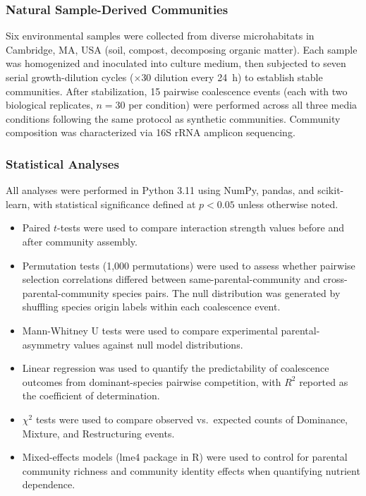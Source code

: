 \subsubsection*{Natural Sample-Derived Communities}
\label{sec:suppl:natural}

Six environmental samples were collected from diverse microhabitats in Cambridge, MA, USA (soil, compost, decomposing organic matter). Each sample was homogenized and inoculated into culture medium, then subjected to seven serial growth-dilution cycles ($\times$30 dilution every 24~h) to establish stable communities. After stabilization, 15 pairwise coalescence events (each with two biological replicates, $n = 30$ per condition) were performed across all three media conditions following the same protocol as synthetic communities. Community composition was characterized via 16S rRNA amplicon sequencing.


\subsubsection*{Statistical Analyses}
\label{sec:suppl:statistics}

All analyses were performed in Python 3.11 using NumPy, pandas, and scikit-learn, with statistical significance defined at $p < 0.05$ unless otherwise noted.

\begin{itemize}
    \item Paired $t$-tests were used to compare interaction strength values before and after community assembly.
    \item Permutation tests (1,000 permutations) were used to assess whether pairwise selection correlations differed between same-parental-community and cross-parental-community species pairs. The null distribution was generated by shuffling species origin labels within each coalescence event.
    \item Mann-Whitney U tests were used to compare experimental parental-asymmetry values against null model distributions.
    \item Linear regression was used to quantify the predictability of coalescence outcomes from dominant-species pairwise competition, with $R^2$ reported as the coefficient of determination.
    \item $\chi^2$ tests were used to compare observed vs.\ expected counts of Dominance, Mixture, and Restructuring events.
    \item Mixed-effects models (lme4 package in R) were used to control for parental community richness and community identity effects when quantifying nutrient dependence.
\end{itemize}


